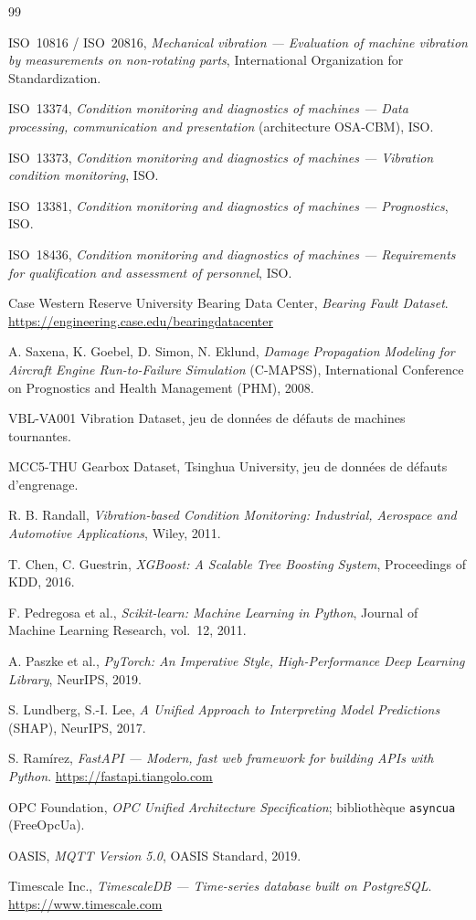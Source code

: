 \begin{thebibliography}{99}

 ISO~10816 / ISO~20816, \emph{Mechanical vibration --- Evaluation of
machine vibration by measurements on non-rotating parts}, International Organization for
Standardization.

 ISO~13374, \emph{Condition monitoring and diagnostics of machines ---
Data processing, communication and presentation} (architecture OSA-CBM), ISO.

 ISO~13373, \emph{Condition monitoring and diagnostics of machines ---
Vibration condition monitoring}, ISO.

 ISO~13381, \emph{Condition monitoring and diagnostics of machines ---
Prognostics}, ISO.

 ISO~18436, \emph{Condition monitoring and diagnostics of machines ---
Requirements for qualification and assessment of personnel}, ISO.

 Case Western Reserve University Bearing Data Center, \emph{Bearing Fault
Dataset}. \url{https://engineering.case.edu/bearingdatacenter}

 A. Saxena, K. Goebel, D. Simon, N. Eklund, \emph{Damage Propagation
Modeling for Aircraft Engine Run-to-Failure Simulation} (C-MAPSS), International Conference
on Prognostics and Health Management (PHM), 2008.

 VBL-VA001 Vibration Dataset, jeu de données de défauts de machines tournantes.

 MCC5-THU Gearbox Dataset, Tsinghua University, jeu de données de défauts
d'engrenage.

 R. B. Randall, \emph{Vibration-based Condition Monitoring: Industrial,
Aerospace and Automotive Applications}, Wiley, 2011.

 T. Chen, C. Guestrin, \emph{XGBoost: A Scalable Tree Boosting System},
Proceedings of KDD, 2016.

 F. Pedregosa et al., \emph{Scikit-learn: Machine Learning in Python},
Journal of Machine Learning Research, vol.~12, 2011.

 A. Paszke et al., \emph{PyTorch: An Imperative Style, High-Performance Deep
Learning Library}, NeurIPS, 2019.

 S. Lundberg, S.-I. Lee, \emph{A Unified Approach to Interpreting Model
Predictions} (SHAP), NeurIPS, 2017.

 S. Ramírez, \emph{FastAPI --- Modern, fast web framework for building APIs
with Python}. \url{https://fastapi.tiangolo.com}

 OPC Foundation, \emph{OPC Unified Architecture Specification}; bibliothèque
\texttt{asyncua} (FreeOpcUa).

 OASIS, \emph{MQTT Version 5.0}, OASIS Standard, 2019.

 Timescale Inc., \emph{TimescaleDB --- Time-series database built on
PostgreSQL}. \url{https://www.timescale.com}

\end{thebibliography}
